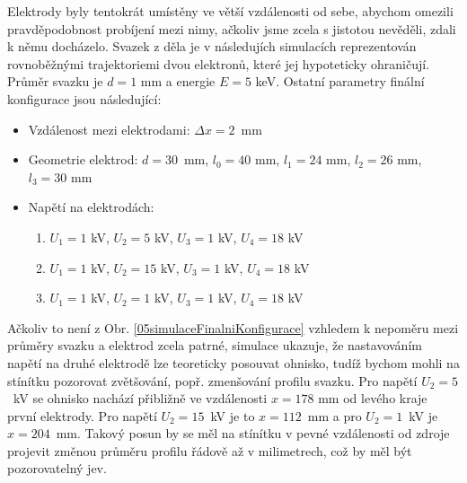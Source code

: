 Elektrody byly tentokrát umístěny ve větší vzdálenosti od sebe, abychom omezili pravděpodobnost probíjení mezi nimy, ačkoliv jsme zcela s jistotou nevěděli, zdali k němu docházelo. Svazek z děla je v následujích simulacích reprezentován rovnoběžnými trajektoriemi dvou elektronů, které jej hypoteticky ohraničují. Průměr svazku je $d = 1$ mm a energie $E = 5$ keV. Ostatní parametry finální konfigurace jsou následující:
\begin{itemize}
	\item Vzdálenost mezi elektrodami: $\Delta x = 2$~mm
	\item Geometrie elektrod: $d = 30$~mm, $l_0 = 40$ mm, $l_1 = 24$ mm, $l_2 = 26$ mm, $l_3 = 30$ mm
	\item Napětí na elektrodách:
	\begin{enumerate}
		\item $U_1 = 1$ kV, $U_2 = 5$ kV, $U_3 = 1$ kV, $U_4 = 18$ kV
		\item $U_1 = 1$ kV, $U_2 = 15$ kV, $U_3 = 1$ kV, $U_4 = 18$ kV
		\item $U_1 = 1$ kV, $U_2 = 1$ kV, $U_3 = 1$ kV, $U_4 = 18$ kV
	\end{enumerate}
\end{itemize}

Ačkoliv to není z Obr. \ref{05simulaceFinalniKonfigurace} vzhledem k nepoměru mezi průměry svazku a elektrod zcela patrné, simulace ukazuje, že nastavováním napětí na druhé elektrodě lze teoreticky posouvat ohnisko, tudíž bychom mohli na stínítku pozorovat zvětšování, popř. zmenšování profilu svazku. Pro napětí $U_2 = 5$~kV se ohnisko nachází přibližně ve vzdálenosti $x = 178$ mm od levého kraje první elektrody. Pro napětí $U_2 = 15$~kV je to $x = 112$~mm a pro $U_2 = 1$~kV je $x = 204$~mm. Takový posun by se měl na stínítku v pevné vzdálenosti od zdroje projevit změnou průměru profilu řádově až v milimetrech, což by měl být pozorovatelný jev.\\

